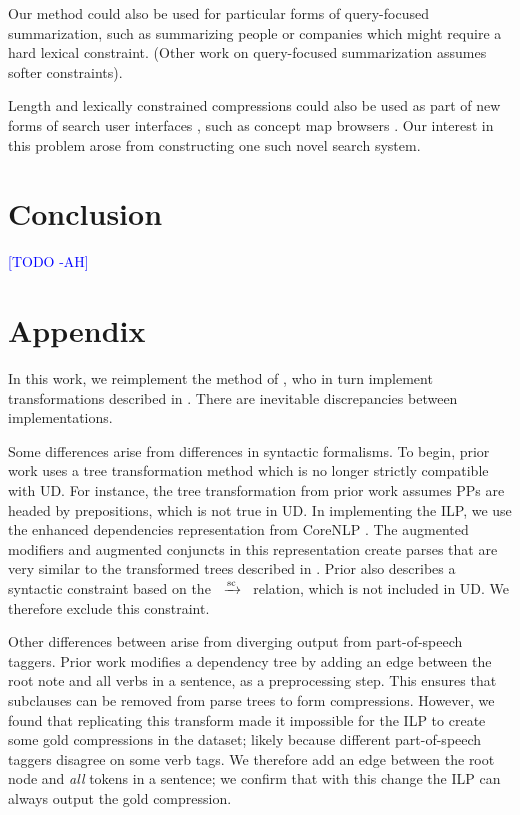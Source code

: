 \documentclass[11pt,a4paper]{article}
\newcommand{\rdep}[1]{\ $\xrightarrow{\text{\tiny #1}}$\ }
\newcommand{\ahcomment}[1]{\textcolor{blue}{[#1 -AH]}}
\begin{document}
Our method could also be used for particular forms of query-focused summarization, such as summarizing people \cite{w04} or companies \cite{filippova2009company} which might require a hard lexical constraint. (Other work on query-focused summarization \cite{das} assumes softer constraints). 

Length and lexically constrained compressions could also be used as part of new forms of search user interfaces \cite{hearst2009search}, such as concept map browsers \cite{falke2017graphdocexplore}. Our interest in this problem arose from constructing one such novel search system.

\section{Conclusion}
\ahcomment{TODO}

\section{Appendix}

In this work, we reimplement the method of \citet{filippova2013overcoming}, who in turn implement transformations described in \citet{filippova2008dependency}. There are inevitable discrepancies between implementations. 

Some differences arise from differences in syntactic formalisms. To begin, prior work uses a tree transformation method which is no longer strictly compatible with UD. For instance, the tree transformation from prior work assumes PPs are headed by prepositions, which is not true in UD. In implementing the ILP, we use the enhanced dependencies representation from CoreNLP \cite{Schuster2016EnhancedEU}. The augmented modifiers and augmented conjuncts in this representation create parses that are very similar to the transformed trees described in \citet{filippova2008dependency}. Prior also describes a syntactic constraint based on the \rdep{sc} relation, which is not included in UD. We therefore exclude this constraint.

Other differences between arise from diverging output from part-of-speech taggers. Prior work modifies a dependency tree by adding an edge between the root note and all verbs in a sentence, as a preprocessing step. This ensures that subclauses can be removed from parse trees to form compressions. However, we found that replicating this transform made it impossible for the ILP to create some gold compressions in the \citet{filippova2013overcoming} dataset; likely because different part-of-speech taggers disagree on some verb tags. We therefore add an edge between the root node and \textit{all} tokens in a sentence; we confirm that with this change the ILP can always output the gold compression.
\end{document}
